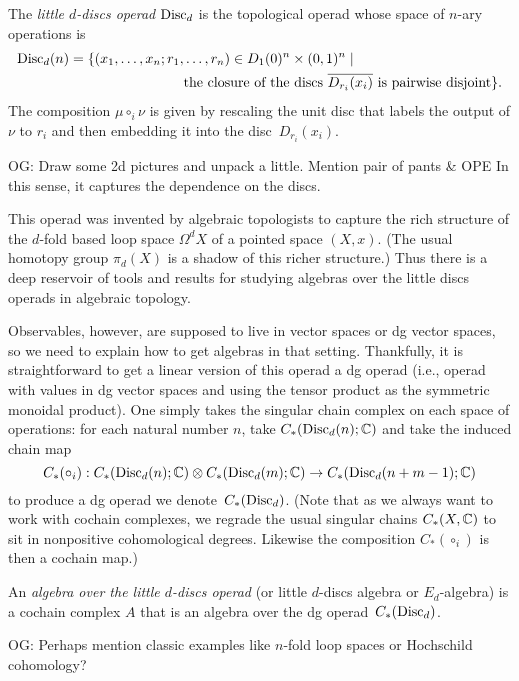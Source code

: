 \documentclass[11pt]{amsart}
\def\owen#1{{\textcolor{violet!65!black}{OG: {#1}}}}
\begin{document}
\begin{dfn}
The {\em little $d$-discs operad} ${\rm Disc}_d$ is the topological operad whose space of $n$-ary operations is
\begin{align*}
{\rm Disc}_d(n) = \{ (x_1, \ldots, x_n; r_1, &\ldots, r_n)  \in D_1(0)^n \times (0,1)^n \;|\; \\
&\text{the closure of the discs $\overline{D_{r_i}(x_i)}$ is pairwise disjoint}\}.
\end{align*}
The composition $\mu \circ_i \nu$ is given by rescaling the unit disc that labels the output of $\nu$ to $r_i$ and then embedding it into the disc~$D_{r_i}(x_i)$.
\end{dfn}

\owen{Draw some 2d pictures and unpack a little. Mention pair of pants \& OPE} 
In this sense, it captures the dependence on the discs.

This operad was invented by algebraic topologists to capture the rich structure of the $d$-fold based loop space $\Omega^d X$ of a pointed space $(X,x)$.
(The usual homotopy group $\pi_d(X)$ is a shadow of this richer structure.)
Thus there is a deep reservoir of tools and results for studying algebras over the little discs operads in algebraic topology.

Observables, however, are supposed to live in vector spaces or dg vector spaces,
so we need to explain how to get algebras in that setting.
Thankfully, it is straightforward to get a linear version of this operad a dg operad (i.e., operad with values in dg vector spaces and using the tensor product as the symmetric monoidal product).
One simply takes the singular chain complex on each space of operations:
for each natural number $n$, take $C_*({\rm Disc}_d(n); \mathbb C)$ and take the induced chain map 
\[
C_*(\circ_i): C_*({\rm Disc}_d(n); \mathbb C) \otimes C_*({\rm Disc}_d(m); \mathbb C) \to C_*({\rm Disc}_d(n+m-1); \mathbb C)
\]
to produce a dg operad we denote~$C_*({\rm Disc}_d)$.
(Note that as we always want to work with cochain complexes, we regrade the usual singular chains $C_*(X, \mathbb C)$ to sit in nonpositive cohomological degrees. 
Likewise the composition $C_*(\circ_i)$ is then a cochain map.)

\begin{dfn}
An {\em algebra over the little $d$-discs operad} (or little $d$-discs algebra or $E_d$-algebra) is a cochain complex $A$ that is an algebra over the dg operad~$C_*({\rm Disc}_d)$.
\end{dfn}

\owen{Perhaps mention classic examples like $n$-fold loop spaces or Hochschild cohomology?}
\end{document}

